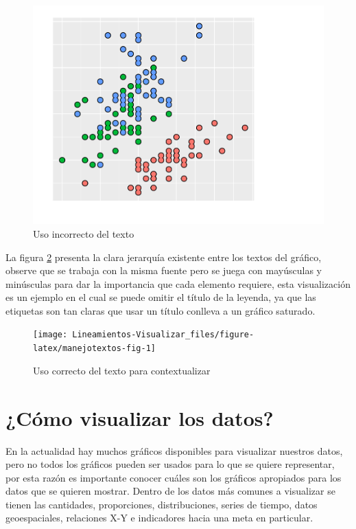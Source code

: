 \documentclass[
]{book}
\begin{document}
\begin{figure}

{\centering \includegraphics[width=0.8\linewidth]{Lineamientos-Visualizar_files/figure-latex/usoincorrectotextos-fig-1} 

}

\caption{Uso incorrecto del texto}\label{fig:usoincorrectotextos-fig}
\end{figure}

La figura \ref{fig:manejotextos-fig} presenta la clara jerarquía existente entre los textos del gráfico, observe que se trabaja con la misma fuente pero se juega con mayúsculas y minúsculas para dar la importancia que cada elemento requiere, esta visualización es un ejemplo en el cual se puede omitir el título de la leyenda, ya que las etiquetas son tan claras que usar un título conlleva a un gráfico saturado.

\begin{figure}

{\centering \texttt{[image: Lineamientos-Visualizar\_files/figure-latex/manejotextos-fig-1]} 

}

\caption{Uso correcto del texto para contextualizar}\label{fig:manejotextos-fig}
\end{figure}

\hypertarget{cuxf3mo-visualizar-los-datos}{%
\chapter{¿Cómo visualizar los datos?}\label{cuxf3mo-visualizar-los-datos}}

En la actualidad hay muchos gráficos disponibles para visualizar nuestros datos, pero no todos los gráficos pueden ser usados para lo que se quiere representar, por esta razón es importante conocer cuáles son los gráficos apropiados para los datos que se quieren mostrar. Dentro de los datos más comunes a visualizar se tienen las cantidades, proporciones, distribuciones, series de tiempo, datos geoespaciales, relaciones X-Y e indicadores hacia una meta en particular.
\end{document}
